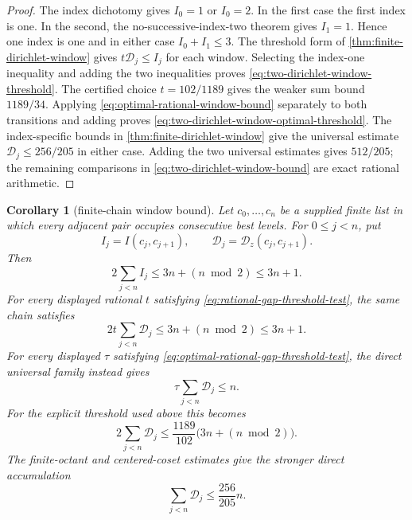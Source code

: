 \documentclass[11pt]{article}
\newtheorem{corollary}[corollary]{Corollary}
\begin{document}
\begin{proof}
The index dichotomy gives $I_0=1$ or $I_0=2$.  In the first case the first
index is one.  In the second, the no-successive-index-two theorem gives
$I_1=1$.  Hence one index is one and in either case $I_0+I_1\le3$.
The threshold form of \cref{thm:finite-dirichlet-window} gives
$t\mathcal D_j\le I_j$ for each window.  Selecting the index-one inequality
and adding the two inequalities proves
\eqref{eq:two-dirichlet-window-threshold}.  The certified choice
$t=102/1189$ gives the weaker sum bound $1189/34$.
Applying \eqref{eq:optimal-rational-window-bound} separately to both
transitions and adding proves
\eqref{eq:two-dirichlet-window-optimal-threshold}.
The index-specific bounds in \cref{thm:finite-dirichlet-window} give the
universal estimate $\mathcal D_j\le256/205$ in either case.  Adding the two
universal estimates gives $512/205$; the remaining comparisons in
\eqref{eq:two-dirichlet-window-bound} are exact rational arithmetic.
\end{proof}

\begin{corollary}[finite-chain window bound]
\label{cor:finite-dirichlet-chain}
Let $c_0,\ldots,c_n$ be a supplied finite list in which every adjacent pair
occupies consecutive best levels.  For $0\le j<n$, put
\[
 I_j=I(c_j,c_{j+1}),\qquad
 \mathcal D_j=\mathcal D_z(c_j,c_{j+1}).
\]
Then
\begin{equation}
\label{eq:finite-chain-index-bound}
 2\sum_{j<n} I_j\le3n+(n\bmod2)\le3n+1.
\end{equation}
For every displayed rational $t$ satisfying
\eqref{eq:rational-gap-threshold-test}, the same chain satisfies
\begin{equation}
\label{eq:finite-chain-window-bound}
 2t\sum_{j<n}\mathcal D_j\le3n+(n\bmod2)\le3n+1.
\end{equation}
For every displayed $\tau$ satisfying
\eqref{eq:optimal-rational-gap-threshold-test}, the direct universal family
instead gives
\begin{equation}
\label{eq:finite-chain-optimal-threshold-bound}
       \tau\sum_{j<n}\mathcal D_j\le n.
\end{equation}
For the explicit threshold used above this becomes
\begin{equation}
\label{eq:finite-chain-refined-window-bound}
 2\sum_{j<n}\mathcal D_j
 \le\frac{1189}{102}\bigl(3n+(n\bmod2)\bigr).
\end{equation}
The finite-octant and centered-coset estimates give the stronger direct
accumulation
\begin{equation}
\label{eq:finite-chain-index-aware-window-bound}
 \sum_{j<n}\mathcal D_j
 \le\frac{256}{205}n.
\end{equation}
\end{corollary}
\end{document}
